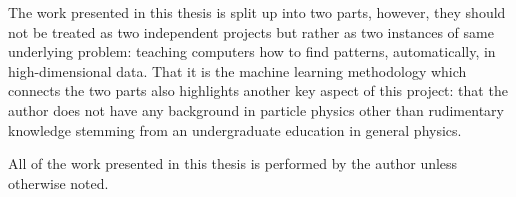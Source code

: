 The work presented in this thesis is split up into two parts, however, they should not be treated as two independent projects but rather as two instances of same underlying problem: teaching computers how to find patterns, automatically, in high-dimensional data. That it is the machine learning methodology which connects the two parts also highlights another key aspect of this project: that the author does not have any background in particle physics other than rudimentary knowledge stemming from an undergraduate education in general physics. 

All of the work presented in this thesis is performed by the author unless otherwise noted.




